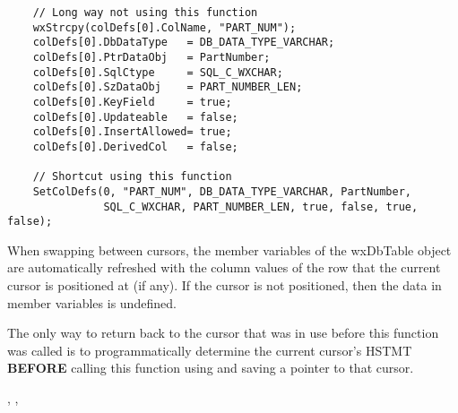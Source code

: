 
\begin{verbatim}
    // Long way not using this function
    wxStrcpy(colDefs[0].ColName, "PART_NUM");
    colDefs[0].DbDataType   = DB_DATA_TYPE_VARCHAR;
    colDefs[0].PtrDataObj   = PartNumber;
    colDefs[0].SqlCtype     = SQL_C_WXCHAR;
    colDefs[0].SzDataObj    = PART_NUMBER_LEN;
    colDefs[0].KeyField     = true;
    colDefs[0].Updateable   = false;
    colDefs[0].InsertAllowed= true;
    colDefs[0].DerivedCol   = false;

    // Shortcut using this function
    SetColDefs(0, "PART_NUM", DB_DATA_TYPE_VARCHAR, PartNumber,
               SQL_C_WXCHAR, PART_NUMBER_LEN, true, false, true, false);
\end{verbatim}

\label{wxdbtablesetcursor}





When swapping between cursors, the member variables of the wxDbTable object
are automatically refreshed with the column values of the row that the
current cursor is positioned at (if any).  If the cursor is not positioned,
then the data in member variables is undefined.

The only way to return back to the cursor that was in use before this
function was called is to programmatically determine the current cursor's HSTMT
{\bf BEFORE} calling this function using 
and saving a pointer to that cursor.


,
,

\label{wxdbtablesetfromclause}


